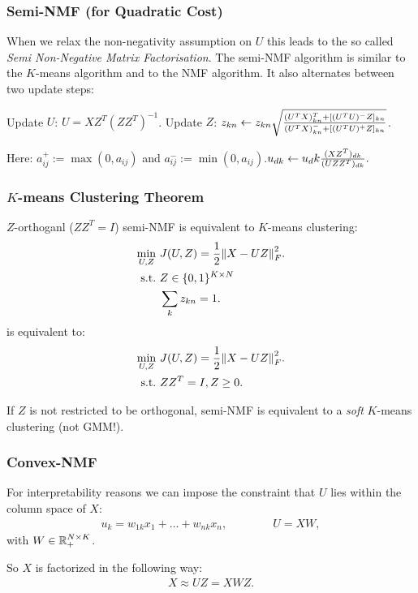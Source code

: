 \subsubsection{Semi-NMF (for Quadratic Cost)}
When we relax the non-negativity assumption on $U$ this leads to the so called
\emph{Semi Non-Negative Matrix Factorisation}. The semi-NMF algorithm is similar to the $K$-means algorithm and to the NMF algorithm. It also alternates between two update steps:
\begin{algorithmic}
\STATE Update $U$: $U=XZ^T (ZZ^T)^{-1}$.
\STATE Update $Z$: $z_{kn} \gets z_{kn} \sqrt{{(U^T X)_{kn}^T +[(U^T U)^- Z]_{kn} \over (U^TX)_{kn}^- + [(U^TU)^+ Z]_{kn}}}$.
\end{algorithmic}
Here: $a_{ij}^+ := \max(0,a_{ij})$ and $a_{ij}^- := \min(0,a_{ij})$.$u_{dk} \gets u_dk {(XZ^T)_{dk}\over (UZZ^T)_{dk}}.$

\subsubsection{$K$-means Clustering Theorem}
$Z$-orthoganl ($ZZ^T = I$) semi-NMF is equivalent to $K$-means clustering:
\begin{align*}
    \min_{U,Z}\ &J(U,Z) ={1\over 2} \norm{X-UZ}_F^2.\\
    \text{s.t.}\ &Z\in \{0,1\}^{K\times N}\\
    &\sum_k z_{kn} = 1.
\end{align*}
is equivalent to:
\begin{align*}
    \min_{U,Z}\ &J(U,Z) ={1\over 2} \norm{X-UZ}_F^2.\\
    \text{s.t.}\ & ZZ^T = I,Z \geq 0.
\end{align*}

If $Z$ is not restricted to be orthogonal, semi-NMF is equivalent to a \emph{soft} $K$-means clustering (not GMM!).

\subsubsection{Convex-NMF}
For interpretability reasons we can impose the constraint that $U$ lies within the column space of $X$:
\begin{align*}
    u_k = w_{1k} x_1 + \ldots + w_{nk} x_n,\qquad \qquad U=XW,
\end{align*}
with $W\in \mathbb{R}_+^{N\times K}$.

So $X$ is factorized in the following way:
\begin{align*}
    X\approx UZ = XWZ.
\end{align*}

